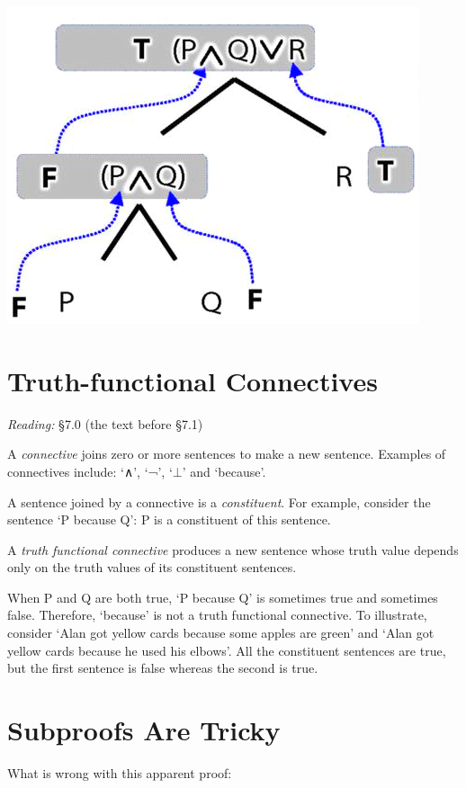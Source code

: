 \documentclass[12pt]{extarticle}
\begin{document}
\begin{multicols*}{3}
\begin{center}
\includegraphics[scale=0.3]{img/unit_230_tree_tt.png}
\end{center}
 
 
\section{Truth-functional Connectives}
 
\emph{Reading:} §7.0 (the text before §7.1)
 
A \emph{connective} joins zero or more sentences to make a new sentence. Examples of connectives include: `∧', `¬', `$\bot$' and `because'.
 
A sentence joined by a connective is a \emph{constituent}. For example, consider the sentence ‘P because Q’: P is a constituent of this sentence.
 
A \emph{truth functional connective} produces a new sentence whose truth value depends only on the truth values of its constituent sentences.
 
When P and Q are both true, ‘P because Q’ is sometimes true and sometimes false. Therefore, ‘because’ is not a truth functional connective. To illustrate, consider `Alan got yellow cards because some apples are green' and `Alan got yellow cards because he used his elbows'. All the constituent sentences are true, but the first sentence is false whereas the second is true.
 
 
 
\section{Subproofs Are Tricky}
 
What is wrong with this apparent proof:
 

\end{multicols*}
\end{document}
